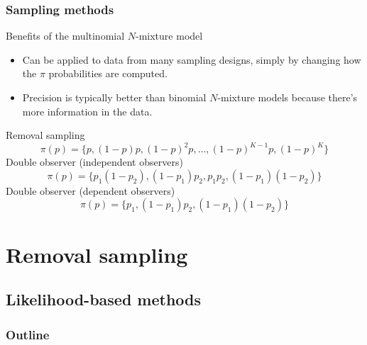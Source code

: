 \documentclass[color=usenames,dvipsnames]{beamer}\usepackage[]{graphicx}\usepackage[]{xcolor}
\begin{document}
\begin{frame}
  \frametitle{Sampling methods}
  Benefits of the multinomial $N$-mixture model
  \begin{itemize}
    \item Can be applied to data from many sampling designs, simply by
      changing how the $\pi$ probabilities are computed. %
    \item Precision is typically better than binomial $N$-mixture
      models because there's more information in the data.
  \end{itemize}
  \pause
  \vfill
  Removal sampling %
  \[
    {\pi(p)} = \{p, (1-p)p, (1-p)^2p, \dots, (1-p)^{K-1}p, (1-p)^K\}
  \]
  \pause %
  Double observer (\alert{independent observers})
  \[
    {\pi(p)} = \{p_1(1-p_2), (1-p_1)p_2, p_1p_2, (1-p_1)(1-p_2)\}
  \]
  \pause %
  Double observer (\alert{dependent observers})
  \[
    {\pi(p)} = \{p_1, (1-p_1)p_2, (1-p_1)(1-p_2)\}
  \]
\end{frame}





\section{Removal sampling}

\subsection{Likelihood-based methods}

\begin{frame}
  \frametitle{Outline}
  \Large
  \tableofcontents[currentsection]
\end{frame}
\end{document}
